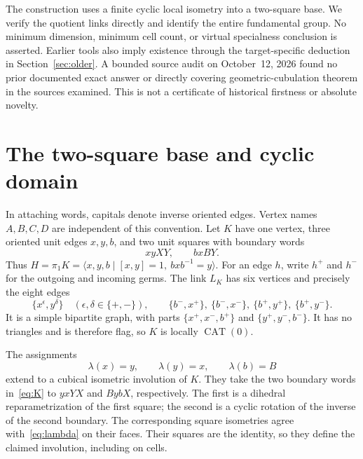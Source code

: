 \documentclass[11pt]{article}
\newcommand{\CAT}{\operatorname{CAT}}
\begin{document}
The construction uses a finite cyclic local isometry into a two-square
base. We verify the quotient links directly and identify the entire
fundamental group. No minimum dimension, minimum cell count, or virtual
specialness conclusion is asserted. Earlier tools also imply existence
through the target-specific deduction in Section~\ref{sec:older}. A bounded
source audit on October~12, 2026 found no prior documented exact answer or
directly covering geometric-cubulation theorem in the sources examined.
This is not a certificate of historical firstness or absolute novelty.

\section{The two-square base and cyclic domain}

In attaching words, capitals denote inverse oriented edges. Vertex names
$A,B,C,D$ are independent of this convention. Let $K$ have one vertex,
three oriented unit edges $x,y,b$, and two unit squares with boundary words
\begin{equation}\label{eq:K}
 xyXY,\qquad bxBY.
\end{equation}
Thus $H=\pi_1K=\langle x,y,b\mid [x,y]=1,\ bxb^{-1}=y\rangle$.
For an edge $h$, write $h^+$ and $h^-$ for the outgoing and incoming
germs. The link $L_K$ has six vertices and precisely the eight edges
\begin{equation}\label{eq:base-link}
 \{x^\epsilon,y^\delta\}\quad(\epsilon,\delta\in\{+,-\}),\qquad
 \{b^-,x^+\},\ \{b^-,x^-\},\ \{b^+,y^+\},\ \{b^+,y^-\}.
\end{equation}
It is a simple bipartite graph, with parts
$\{x^+,x^-,b^+\}$ and $\{y^+,y^-,b^-\}$. It has no triangles and is
therefore flag, so $K$ is locally $\CAT(0)$.

The assignments
\begin{equation}\label{eq:lambda}
 \lambda(x)=y,\qquad\lambda(y)=x,\qquad\lambda(b)=B
\end{equation}
extend to a cubical isometric involution of $K$. They take the two boundary
words in~\eqref{eq:K} to $yxYX$ and $BybX$, respectively. The first is a
dihedral reparametrization of the first square; the second is a cyclic
rotation of the inverse of the second boundary. The corresponding square
isometries agree with~\eqref{eq:lambda} on their faces. Their squares are
the identity, so they define the claimed involution, including on cells.
\end{document}
